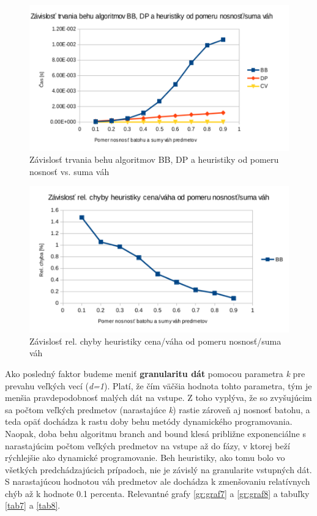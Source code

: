 \documentclass[slovak]{article}
\begin{document}
\begin{figure}[htb!]\centering
	\includegraphics[scale=0.8]{./3_5.pdf}
	\caption{Závislosť trvania behu algoritmov BB, DP a heuristiky od pomeru nosnosť vs. suma váh}
	\label{gr:graf5}
\end{figure}

\begin{figure}[htb!]\centering
	\includegraphics[scale=0.8]{./3_6.pdf}
	\caption{Závislosť rel. chyby heuristiky cena/váha od pomeru nosnosť/suma váh}
	\label{gr:graf6}
\end{figure}

Ako posledný faktor budeme meniť \textbf{granularitu dát} pomocou parametra \emph{k} pre prevahu veľkých vecí (\emph{d=1}). Platí, že čím väčšia hodnota tohto parametra, tým je menšia pravdepodobnosť malých dát na vstupe. Z toho vyplýva, že so zvyšujúcim sa počtom veľkých predmetov (narastajúce \emph{k}) rastie zároveň aj nosnosť batohu, a teda opäť dochádza k rastu doby behu metódy dynamického programovania. Naopak, doba behu algoritmu branch and bound klesá približne exponenciálne s narastajúcim počtom veľkých predmetov na vstupe až do fázy, v ktorej beží rýchlejšie ako dynamické programovanie. Beh heuristiky, ako tomu bolo vo všetkých predchádzajúcich prípadoch, nie je závislý na granularite vstupných dát. S narastajúcou hodnotou váh predmetov ale dochádza k zmenšovaniu relatívnych chýb až k hodnote 0.1 percenta. Relevantné grafy \ref{gr:graf7} a \ref{gr:graf8} a tabuľky \ref{tab7} a \ref{tab8}.
\end{document}
